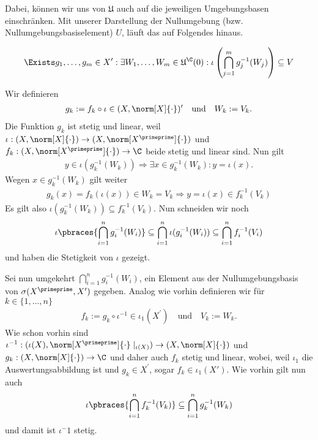 \begin{solution}
\begin{enumerate}[label = (\arabic*)]
  Dabei, können wir uns von $\mathfrak{U}$ auch auf die jeweiligen Umgebungsbasen einschränken.
  Mit unserer Darstellung der Nullumgebung (bzw. Nullumgebungsbasiselement) $U$, läuft das auf Folgendes hinaus.

  \begin{align*}
    \Exists g_1, \dots, g_m \in X^{\prime}:
    \exists W_1, \dots, W_m \in \mathfrak{U}^\C(0):
    \iota\left(\bigcap_{j=1}^m g_j^{-1}(W_j)\right) \subseteq V
  \end{align*}

  Wir definieren
  \begin{align*}
    g_k := f_k \circ \iota \in (X,\norm[X]{\cdot})^\prime \quad \textrm{und} \quad W_k := V_k.
  \end{align*}
  Die Funktion $g_k$ ist stetig und linear, weil $\iota: (X, \norm[X]{\cdot}) \to (X, \norm[X^\primeprime]{\cdot})$ und $f_k: (X, \norm[X^\primeprime]{\cdot}) \to \C$ beide stetig und linear sind.
  Nun gilt
  \begin{align*}
    y \in \iota(g_k^{-1}(W_k)) \Rightarrow \exists x \in g_k^{-1}(W_k): y = \iota(x).
  \end{align*}
  Wegen $x \in g_k^{-1}(W_k)$ gilt weiter
  \begin{align*}
    g_k(x) = f_k(\iota(x)) \in W_k = V_k \Rightarrow y = \iota(x) \in f_k^{-1}(V_k)
  \end{align*}
  Es gilt also $\iota(g_k^{-1}(W_k)) \subseteq f_k^{-1}(V_k)$. Nun schneiden wir noch
  \begin{align*}
    \iota\pbraces{\bigcap_{i = 1}^n g_i^{-1}(W_i)} \subseteq \bigcap_{i = 1}^n \iota(g_i^{-1}(W_i)) \subseteq \bigcap_{i=1}^n f_i^{-1}(V_i)
  \end{align*}
  und haben die Stetigkeit von $\iota$ gezeigt.

  Sei nun umgekehrt $\bigcap_{i = 1}^n g_i^{-1}(W_i)$, ein Element aus der Nullumgebungsbasis von $\sigma(X^\primeprime, X^\prime)$ gegeben. Analog wie vorhin definieren wir für $k \in \{1, \dots, n\}$
  \begin{align*}
    f_k := g_k \circ \iota^{-1} \in \iota_1(X^\prime) \quad \textrm{und} \quad V_k := W_k.
  \end{align*}
  Wie schon vorhin sind $\iota^{-1}: (\iota(X), \norm[X^\primeprime]{\cdot}\mid_{\iota(X)}) \to (X, \norm[X]{\cdot})$ und $g_k: (X, \norm[X]{\cdot}) \to \C$ und daher auch $f_k$ stetig und linear, wobei, weil $\iota_1$ die Auswertungsabbildung ist und $g_k \in X^\prime$, sogar $f_k \in \iota_1(X\prime)$. Wie vorhin gilt nun auch
  \begin{align*}
    \iota \pbraces{\bigcap_{i = 1}^n f_k^{-1}(V_k)} \subseteq \bigcap_{i = 1}^n g_k^{-1}(W_k)
  \end{align*}
  und damit ist $\iota^-1$ stetig.


\end{enumerate}
\end{solution}
